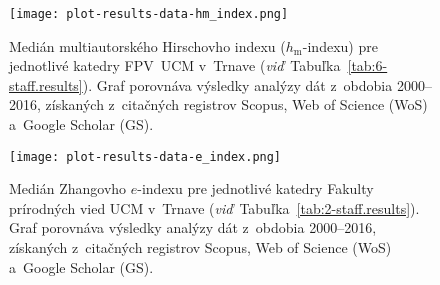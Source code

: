 \begin{figure}
  \centering
  \texttt{[image: plot-results-data-hm\_index.png]}
  \caption[Medián $h_\mathrm{m}$-indexu pre jednotlivé katedry FPV]%
  {Medián multiautorského Hirschovho indexu ($h_\mathrm{m}$-indexu) pre
    jednotlivé katedry FPV~UCM v~Trnave
    (\emph{viď}~Tabuľka~\ref{tab:6-staff.results}).  Graf porovnáva výsledky
    analýzy dát z~obdobia 2000--2016, získaných z~citačných registrov Scopus,
    Web of Science (WoS) a~Google Scholar (GS).}
  \label{fig:hm-index.plot}
\end{figure}

\begin{figure}
  \centering
  \texttt{[image: plot-results-data-e\_index.png]}
  \caption[Medián $e$-indexu pre jednotlivé katedry FPV]%
  {Medián Zhangovho $e$-indexu pre jednotlivé katedry Fakulty prírodných vied
    UCM v~Trnave (\emph{viď}~Tabuľka~\ref{tab:2-staff.results}).  Graf porovnáva
    výsledky analýzy dát z~obdobia 2000--2016, získaných z~citačných registrov
    Scopus, Web of Science (WoS) a~Google Scholar (GS).}
  \label{fig:e-index.plot}
\end{figure}


